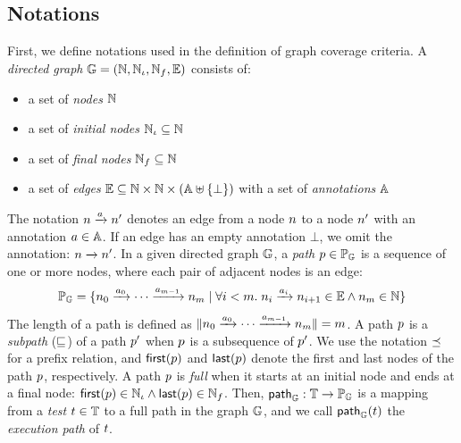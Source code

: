 \subsection{Notations}\label{sec:notation}
%
First, we define notations used in the definition of graph coverage criteria.
%
A \textit{directed graph} $\mathbb{G} = (\mathbb{N}, \mathbb{N}_\iota,
\mathbb{N}_f, \mathbb{E})$ consists of:
\begin{itemize}
  \item a set of \textit{nodes} $\mathbb{N}$
  \item a set of \textit{initial nodes} $\mathbb{N}_\iota \subseteq \mathbb{N}$
  \item a set of \textit{final nodes} $\mathbb{N}_f \subseteq \mathbb{N}$
  \item a set of \textit{edges} $\mathbb{E} \subseteq \mathbb{N} \times \mathbb{N}
    \times (\mathbb{A} \uplus \{ \bot \})$ with a set of \textit{annotations}
    $\mathbb{A}$
\end{itemize}
%
The notation $n \xrightarrow{a} n'$ denotes an edge from a node $n$ to
a node $n'$ with an annotation $a \in \mathbb{A}$.
%
If an edge has an empty annotation $\bot$, we omit the annotation: $n
\xrightarrow{} n'$.
%
In a given directed graph $\mathbb{G}$, a \textit{path} $p \in \mathbb{P}_{\mathbb{G}}$
is a sequence of one or more nodes, where each pair of adjacent nodes is an
edge:
\begin{equation}\label{euq:path-def}
  \mathbb{P}_{\mathbb{G}} = \{
    n_0 \xrightarrow{a_0} \cdots \xrightarrow{a_{m-1}} n_m \mid
    \forall i < m. \; n_i \xrightarrow{a_i} n_{i+1} \in \mathbb{E} \wedge
    n_m \in \mathbb{N}
  \}
\end{equation}
%
The length of a path is defined as $\lVert{n_0 \xrightarrow{a_0} \cdots
\xrightarrow{a_{m-1}} n_m}\rVert = m$.
%
A path $p$ is a \textit{subpath} ($\sqsubseteq$) of a path $p'$ when $p$
is a subsequence of $p'$.
%
We use the notation $\preceq$ for a prefix relation, and $\textsf{first}(p)$ and
$\textsf{last}(p)$ denote the first and last nodes of the path $p$,
respectively.
%
A path $p$ is \textit{full} when it starts at an initial node and ends at a
final node: $\textsf{first}(p) \in \mathbb{N}_\iota \wedge \textsf{last}(p) \in \mathbb{N}_f$.
%
Then, $\textsf{path}_{\mathbb{G}} : \mathbb{T} \rightarrow \mathbb{P}_{\mathbb{G}}$ is a mapping from
a \textit{test} $t \in \mathbb{T}$ to a full path in the graph $\mathbb{G}$, and
we call $\textsf{path}_{\mathbb{G}}(t)$ the \textit{execution path} of $t$.


